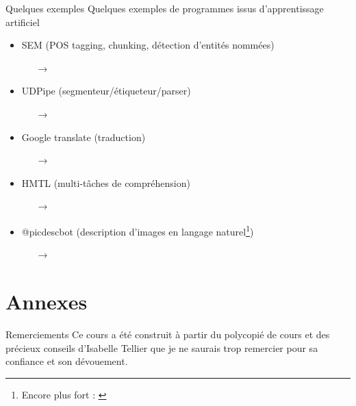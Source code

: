 \documentclass[xcolor={svgnames}, french]{beamer}
\begin{document}
\begin{frame}{Quelques exemples}
	Quelques exemples de programmes issus d'apprentissage artificiel
	\begin{itemize}
		\item SEM (POS tagging, chunking, détection d'entités nommées)
			\begin{itemize}
				\item[→] 
			\end{itemize}
		\item UDPipe (segmenteur/étiqueteur/parser)
			\begin{itemize}
				\item[→] 
			\end{itemize}
		\item Google translate (traduction)
			\begin{itemize}
				\item[→] 
			\end{itemize}
		\item HMTL (multi-tâches de compréhension)
			\begin{itemize}
				\item[→] 
			\end{itemize}
		\item @picdescbot (description d'images en langage naturel\footnote{Encore plus fort :  \parencite{alishahi2017EncodingPhonologyRecurrent}})
			\begin{itemize}
				\item[→] 
			\end{itemize}
	\end{itemize}
\end{frame}


\appendix
{}  %
\section{Annexes}
\begin{frame}{Remerciements}
	Ce cours a été construit à partir du polycopié de cours  \parencite{tellier2017IntroductionFouilleTextes} et des précieux conseils d'Isabelle Tellier que je ne saurais trop remercier pour sa confiance et son dévouement.
\end{frame}
\end{document}

